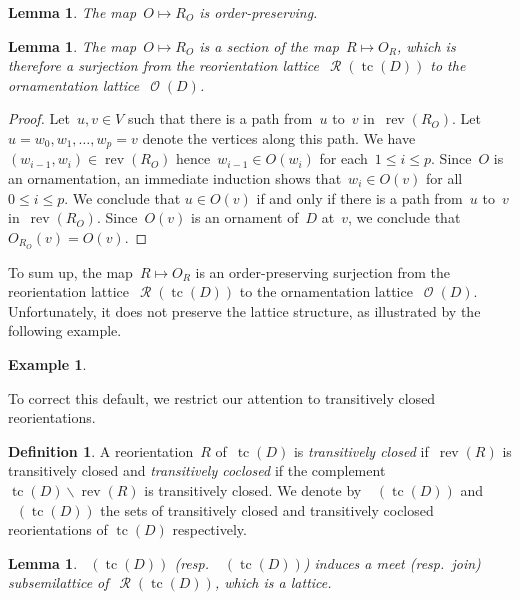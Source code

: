 \documentclass{amsart}
\newtheorem{lemma}[theorem]{Lemma}
\theoremstyle{definition}
\newtheorem{definition}[theorem]{Definition}
\newtheorem{example}[theorem]{Example}
\renewcommand{\c}[1]{\mathcal{#1}} %
\newcommand{\ssm}{\smallsetminus} %
\DeclareMathOperator{\tc}{tc} %
\newcommand{\darkblue}{\color{darkblue}} %
\newcommand{\defn}[1]{\textsl{\darkblue #1}} %
\DeclareMathOperator{\Orn}{\c{O}}  %
\DeclareMathOperator{\Reori}{\c{R}}  %
\DeclareMathOperator{\Rcl}{\c{R}^{cl}}  %
\DeclareMathOperator{\Rco}{\c{R}^{co}}  %
\DeclareMathOperator{\rev}{rev} %
\begin{document}
\begin{lemma}
\label{lem:Orn2Reori1}
The map~$O \mapsto R_{O}$ is order-preserving.
\end{lemma}

\begin{lemma}
\label{lem:Orn2Reori1}
The map~$O \mapsto R_O$ is a section of the map~$R \mapsto O_{\!R}$, which is therefore a surjection from the reorientation lattice~$\Reori(\tc(D))$ to the ornamentation lattice~$\Orn(D)$.
\end{lemma}

\begin{proof}
Let~$u,v \in V$ such that there is a path from~$u$ to~$v$ in~$\rev(R_O)$.
Let~$u = w_0, w_1, \dots, w_p = v$ denote the vertices along this path.
We have~$(w_{i-1},w_i) \in \rev(R_O)$ hence~$w_{i-1} \in O(w_i)$ for each~$1 \le i \le p$.
Since~$O$ is an ornamentation, an immediate induction shows that~$w_i \in O(v)$ for all~$0 \le i \le p$.
We conclude that $u \in O(v)$ if and only if there is a path from~$u$ to~$v$ in~$\rev(R_O)$.
Since~$O(v)$ is an ornament of~$D$ at~$v$, we conclude that~$O_{\!R_O}(v) = O(v)$.
\end{proof}

To sum up, the map~$R \mapsto O_{\!R}$ is an order-preserving surjection from the reorientation lattice~$\Reori(\tc(D))$ to the ornamentation lattice~$\Orn(D)$.
Unfortunately, it does not preserve the lattice structure, as illustrated by the following example.

\begin{example}
\end{example}

To correct this default, we restrict our attention to transitively closed reorientations.

\begin{definition}
A reorientation~$R$ of~$\tc(D)$ is \defn{transitively closed} if~$\rev(R)$ is transitively closed %
and \defn{transitively coclosed} if the complement~$\tc(D) \ssm \rev(R)$ is transitively closed.
We denote by~$\Rcl(\tc(D))$ and $\Rco(\tc(D))$ the sets of transitively closed and transitively coclosed reorientations of $\tc(D)$ respectively.
\end{definition}

\begin{lemma}
$\Rcl(\tc(D))$ (resp.~$\Rco(\tc(D))$) induces a meet (resp.~join) subsemilattice of~$\Reori(\tc(D))$, which is a lattice.
\end{lemma}
\end{document}
